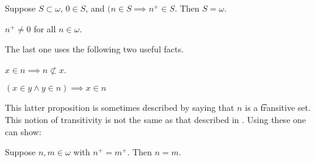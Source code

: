 \begin{proposition}
  Suppose $S \subset \omega$, $0 \in S$, and $(n \in S \implies n^+ \in S$.
  Then $S = \omega$.
\end{proposition}

\begin{proposition}
  $n^+ \neq 0$ for all $n \in \omega$.
\end{proposition}

The last one uses the following two useful facts.

\begin{proposition}
  $x \in n \implies n \not\subset x$.
\end{proposition}
\begin{proposition}
  $(x \in y \land y \in n) \implies x \in n$
\end{proposition}
This latter proposition is sometimes described by saying that $n$ is a \t{transitive set}.
This notion of transitivity is not the same as that described in .
Using these one can show:

\begin{proposition}
  Suppose $n, m \in \omega$ with $n^+ = m^+$.
  Then $n = m$.
\end{proposition}
